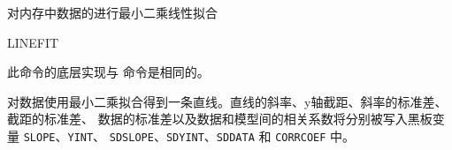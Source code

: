 \label{cmd:linefit}

对内存中数据的进行最小二乘线性拟合

\begin{SACSTX}
LINEFIT
\end{SACSTX}

此命令的底层实现与  命令是相同的。

对数据使用最小二乘拟合得到一条直线。直线的斜率、y轴截距、斜率的标准差、截距的标准差、
数据的标准差以及数据和模型间的相关系数将分别被写入黑板变量 \texttt{SLOPE}、\texttt{YINT}、
\texttt{SDSLOPE}、\texttt{SDYINT}、\texttt{SDDATA} 和 \texttt{CORRCOEF} 中。
